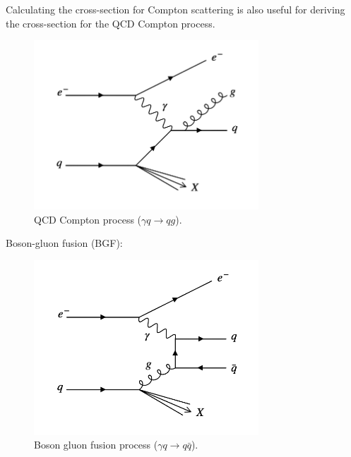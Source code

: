 Calculating the cross-section for Compton scattering is also useful for deriving the cross-section for the QCD Compton process.

\begin{figure}[!htb]
  \begin{center}
    \includegraphics[width=0.75\textwidth]{images/web_feynman/image_38.png}
    \caption[QCD Compton process]{QCD Compton process ($\gamma q \to qg$).}
    \label{fig:ch11_GammaQToGQ}
  \end{center}
\end{figure}

Boson-gluon fusion (BGF):

\begin{figure}[!htb]
  \begin{center}
    \includegraphics[width=0.75\textwidth]{images/web_feynman/image_39.png}
    \caption[Boson gluon fusion process]{Boson gluon fusion process ($\gamma q \to q\bar{q}$).}
    \label{fig:ch11_GammaQToQQ}
  \end{center}
\end{figure}

